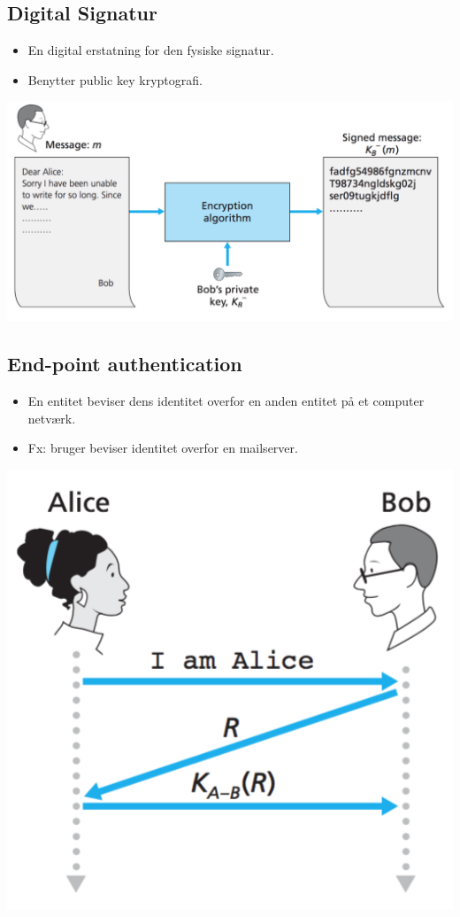 {{\subsection{Digital Signatur}
\begin{itemize}
	\item En digital erstatning for den fysiske signatur.
	\item Benytter public key kryptografi.
\end{itemize}
{\includegraphics[scale=0.7]{8-security-overview/digital-signature.png}

\subsection{End-point authentication}
\begin{itemize}
	\item En entitet beviser dens identitet overfor en anden entitet på et computer netværk.
	\item Fx: bruger beviser identitet overfor en mailserver.
\end{itemize}

{\includegraphics[scale=0.9]{8-security-overview/endpoint.png}

}}}}
